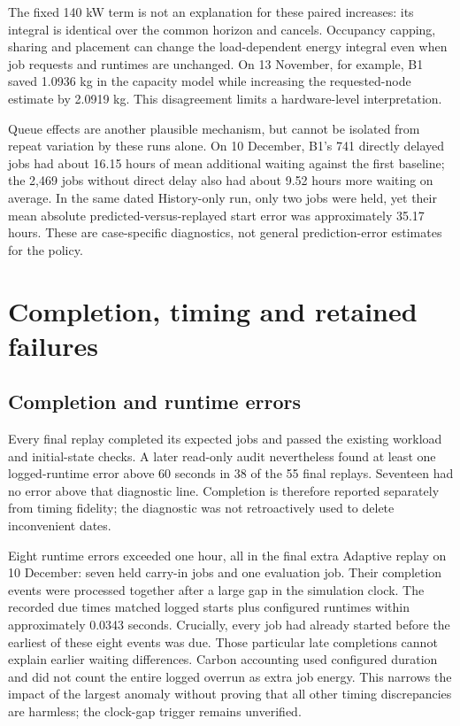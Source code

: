 The fixed 140 kW term is not an explanation for these paired increases: its integral is identical over the common horizon and cancels. Occupancy capping, sharing and placement can change the load-dependent energy integral even when job requests and runtimes are unchanged. On 13 November, for example, B1 saved 1.0936 kg in the capacity model while increasing the requested-node estimate by 2.0919 kg. This disagreement limits a hardware-level interpretation.

Queue effects are another plausible mechanism, but cannot be isolated from repeat variation by these runs alone. On 10 December, B1's 741 directly delayed jobs had about 16.15 hours of mean additional waiting against the first baseline; the 2,469 jobs without direct delay also had about 9.52 hours more waiting on average. In the same dated History-only run, only two jobs were held, yet their mean absolute predicted-versus-replayed start error was approximately 35.17 hours. These are case-specific diagnostics, not general prediction-error estimates for the policy.

\section{Completion, timing and retained failures}\label{sec:timing-audit}
\subsection{Completion and runtime errors}
Every final replay completed its expected jobs and passed the existing workload and initial-state checks. A later read-only audit nevertheless found at least one logged-runtime error above 60 seconds in 38 of the 55 final replays. Seventeen had no error above that diagnostic line. Completion is therefore reported separately from timing fidelity; the diagnostic was not retroactively used to delete inconvenient dates.

Eight runtime errors exceeded one hour, all in the final extra Adaptive replay on 10 December: seven held carry-in jobs and one evaluation job. Their completion events were processed together after a large gap in the simulation clock. The recorded due times matched logged starts plus configured runtimes within approximately 0.0343 seconds. Crucially, every job had already started before the earliest of these eight events was due. Those particular late completions cannot explain earlier waiting differences. Carbon accounting used configured duration and did not count the entire logged overrun as extra job energy. This narrows the impact of the largest anomaly without proving that all other timing discrepancies are harmless; the clock-gap trigger remains unverified.

